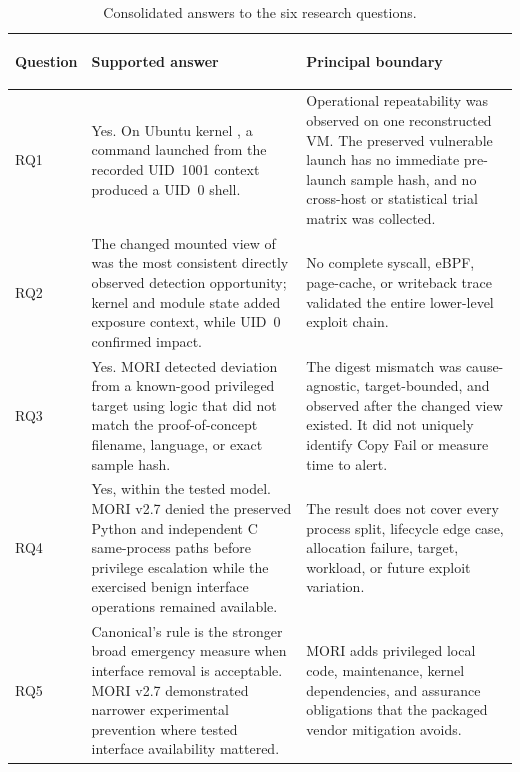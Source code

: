 \begin{table}[H]
    \centering
    \caption{Consolidated answers to the six research questions.}
    \label{tab:final-rq-synthesis}
    \scriptsize
    \begin{tabularx}{\textwidth}{@{}>{\bfseries\raggedright\arraybackslash}p{}>{\raggedright\arraybackslash}p{}Y@{}}
        \toprule
        Question & Supported answer & Principal boundary \\
        \midrule
        RQ1 &
        Yes. On Ubuntu kernel , a command launched from
        the recorded UID~1001  context produced a UID~0 shell. &
        Operational repeatability was observed on one reconstructed VM. The
        preserved vulnerable launch has no immediate pre-launch sample hash,
        and no cross-host or statistical trial matrix was collected. \\

        RQ2 &
        The changed mounted view of  was the most consistent
        directly observed detection opportunity; kernel and module state added
        exposure context, while UID~0 confirmed impact. &
        No complete syscall, eBPF, page-cache, or writeback trace validated the
        entire lower-level exploit chain. \\

        RQ3 &
        Yes. MORI detected deviation from a known-good privileged target using
        logic that did not match the proof-of-concept filename, language, or
        exact sample hash. &
        The digest mismatch was cause-agnostic, target-bounded, and observed
        after the changed view existed. It did not uniquely identify Copy Fail
        or measure time to alert. \\

        RQ4 &
        Yes, within the tested model. MORI v2.7 denied the preserved Python and
        independent C same-process paths before privilege escalation while the
        exercised benign interface operations remained available. &
        The result does not cover every process split, lifecycle edge case,
        allocation failure, target, workload, or future exploit variation. \\

        RQ5 &
        Canonical's  rule is the stronger broad emergency measure
        when interface removal is acceptable. MORI v2.7 demonstrated narrower
        experimental prevention where tested interface availability mattered. &
        MORI adds privileged local code, maintenance, kernel dependencies, and
        assurance obligations that the packaged vendor mitigation avoids. \\


\end{tabularx}
\end{table}
